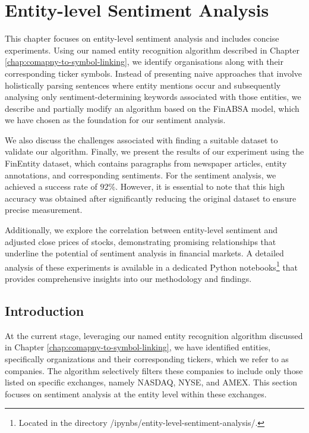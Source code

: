 \chapter{Entity-level Sentiment Analysis}
\label{chap:entity-level-sentiment-analysis}
This chapter focuses on entity-level sentiment analysis and includes concise experiments. Using our named entity recognition algorithm described in Chapter \ref{chap:comapny-to-symbol-linking}, we identify organisations along with their corresponding ticker symbols. Instead of presenting naive approaches that involve holistically parsing sentences where entity mentions occur and subsequently analysing only sentiment-determining keywords associated with those entities, we describe and partially modify an algorithm based on the FinABSA model, which we have chosen as the foundation for our sentiment analysis.

We also discuss the challenges associated with finding a suitable dataset to validate our algorithm. Finally, we present the results of our experiment using the FinEntity dataset, which contains paragraphs from newspaper articles, entity annotations, and corresponding sentiments. For the sentiment analysis, we achieved a success rate of $92\%$. However, it is essential to note that this high accuracy was obtained after significantly reducing the original dataset to ensure precise measurement. 

Additionally, we explore the correlation between entity-level sentiment and adjusted close prices of stocks, demonstrating promising relationships that underline the potential of sentiment analysis in financial markets. A detailed analysis of these experiments is available in a dedicated Python notebooks\footnote{Located in the directory /ipynbs/entity-level-sentiment-analysis/.} that provides comprehensive insights into our methodology and findings.

\section{Introduction}
\label{sec:elsa-introduction}
At the current stage, leveraging our named entity recognition algorithm discussed in Chapter \ref{chap:comapny-to-symbol-linking}, we have identified entities, specifically organizations and their corresponding tickers, which we refer to as companies. The algorithm selectively filters these companies to include only those listed on specific exchanges, namely NASDAQ, NYSE, and AMEX. This section focuses on sentiment analysis at the entity level within these exchanges.

